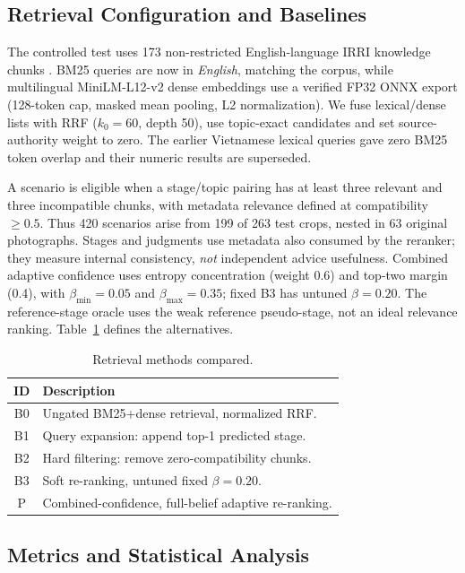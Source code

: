 \documentclass[conference,a4paper]{IEEEtran}
\begin{document}
\subsection{Retrieval Configuration and Baselines}

The controlled test uses 173 non-restricted English-language IRRI knowledge chunks \cite{irri_knowledge_bank}. BM25 queries are now in \emph{English}, matching the corpus, while multilingual MiniLM-L12-v2 dense embeddings use a verified FP32 ONNX export (128-token cap, masked mean pooling, L2 normalization). We fuse lexical/dense lists with RRF ($k_0=60$, depth 50), use topic-exact candidates and set source-authority weight to zero. The earlier Vietnamese lexical queries gave zero BM25 token overlap and their numeric results are superseded.

A scenario is eligible when a stage/topic pairing has at least three relevant and three incompatible chunks, with metadata relevance defined at compatibility $\geq0.5$. Thus 420 scenarios arise from 199 of 263 test crops, nested in 63 original photographs. Stages and judgments use metadata also consumed by the reranker; they measure internal consistency, \emph{not} independent advice usefulness. Combined adaptive confidence uses entropy concentration (weight 0.6) and top-two margin (0.4), with $\beta_{\min}=0.05$ and $\beta_{\max}=0.35$; fixed B3 has untuned $\beta=0.20$. The reference-stage oracle uses the weak reference pseudo-stage, not an ideal relevance ranking. Table~\ref{tab:methods} defines the alternatives.

\begin{table}[t]
\centering
\caption{Retrieval methods compared.}
\label{tab:methods}
\footnotesize
\begin{tabular}{cp{}}
\toprule
\textbf{ID} & \textbf{Description} \\
\midrule
B0 & Ungated BM25+dense retrieval, normalized RRF. \\
B1 & Query expansion: append top-1 predicted stage. \\
B2 & Hard filtering: remove zero-compatibility chunks. \\
B3 & Soft re-ranking, untuned fixed $\beta = 0.20$. \\
P  & Combined-confidence, full-belief adaptive re-ranking. \\
\bottomrule
\end{tabular}
\end{table}

\subsection{Metrics and Statistical Analysis}
\end{document}
